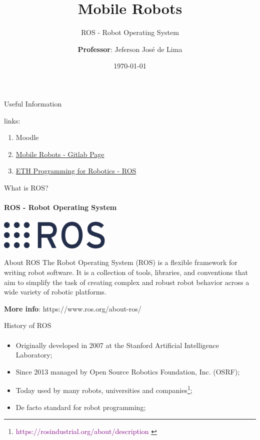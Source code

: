 \documentclass{beamer}
\title{Mobile Robots}
\subtitle{ROS - Robot Operating System}
\date{\today}
\author[Jeferson José de Lima]{
  \textbf{Professor}: Jeferson José de Lima}
\institute[Federal University of Technology - Paraná (UTFPR) at Pato Branco, PR, Brazil]{Academic Department of Informatics (DAINF)}
\begin{document}
\maketitle
\justify


\begin{frame}{Useful Information}
	\begin{block}{links:}
		\begin{enumerate}
			\item Moodle
			\item \href{https://gitlab.com/cursoseaulas/robotica-movel/-/wikis/home}{Mobile Robots - Gitlab Page}
			\item \href{http://www.rsl.ethz.ch/education-students/lectures/ros.html}{ETH Programming for Robotics - ROS}
		\end{enumerate}
	\end{block}
\end{frame}



\begin{frame}{What is ROS?}
	\framesubtitle{ROS - Robot Operating System}
	\centering
	\includegraphics[width=0.4\textwidth]{./images/500px-Ros_logo.svg.png}
	\begin{block}{About ROS}
		The Robot Operating System (ROS) is a flexible framework for writing robot software. It is a collection of tools, libraries, and conventions that aim to simplify the task of creating complex and robust robot behavior across a wide variety of robotic platforms.

		{\tiny \textbf{More info}: 
		https://www.ros.org/about-ros/}
	\end{block}
\end{frame}


\begin{frame}{History of ROS}
	\framesubtitle{}
	\begin{itemize}
		\item Originally developed in 2007 at the Stanford Artificial Intelligence Laboratory;
		\item Since 2013 managed by Open Source Robotics Foundation, Inc. (OSRF);
		\item Today used by many robots, universities and companies\footnote[frame]{\textcolor{purple}{ https://rosindustrial.org/about/description }};
		\item De facto standard for robot programming;
	\end{itemize}
\end{frame}
\end{document}
